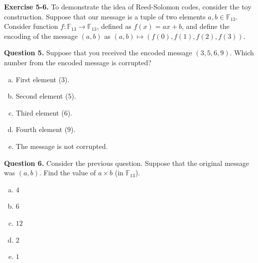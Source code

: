 \documentclass[../lecture-notes.tex]{subfiles}
\begin{document}
\textbf{Exercise 5-6.} To demonstrate the idea of Reed-Solomon codes, consider the toy construction. Suppose that our message is a tuple of two elements $a,b \in \mathbb{F}_{13}$. Consider function $f: \mathbb{F}_{13} \to \mathbb{F}_{13}$, defined as $f(x) = ax+b$, and define the encoding of the message $(a,b)$ as $(a,b) \mapsto (f(0),f(1),f(2),f(3))$. 

\textbf{Question 5.} Suppose that you received the encoded message $(3,5,6,9)$. Which number from the encoded message is corrupted?
\begin{multicols}{2}
    \begin{enumerate}[a)]
        \item First element ($3$).
        \item Second element ($5$).
        \item Third element ($6$).
        \item Fourth element ($9$).
        \item The message is not corrupted.
    \end{enumerate}
\end{multicols}

\textbf{Question 6.} Consider the previous question. Suppose that the original message was $(a,b)$. Find the value of $a \times b$ (in $\mathbb{F}_{13}$).
\begin{multicols}{5}
    \begin{enumerate}[a)]
        \item $4$
        \item $6$
        \item $12$
        \item $2$
        \item $1$
    \end{enumerate}
\end{multicols}
\end{document}
